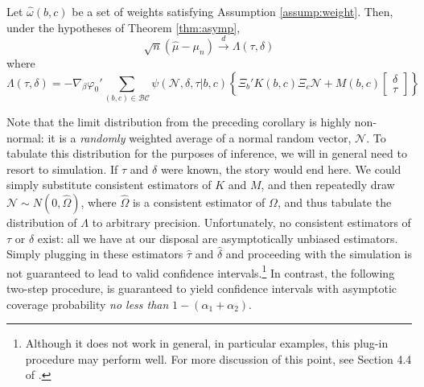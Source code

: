 \begin{cor}
Let $\widehat{\omega}(b,c)$ be a set of weights satisfying Assumption \ref{assump:weight}. Then, under the hypotheses of Theorem \ref{thm:asymp},  
	$$\sqrt{n}\left(\widehat{\mu} - \mu_n\right) \overset{d}{\rightarrow} \Lambda(\tau,\delta)$$
where
	\begin{equation}
		\Lambda(\tau,\delta) = -\nabla_\beta\varphi_0' \sum_{(b,c) \in \mathcal{BC}} \psi(\mathscr{N},\delta, \tau|b,c) \left\{\Xi_b' K(b,c) \Xi_c \mathscr{N} + M(b,c)  \left[\begin{array}{c}\delta \\ \tau \end{array} \right]\right\}
	\end{equation}
\end{cor}
Note that the limit distribution from the preceding corollary is highly non-normal: it is a \emph{randomly} weighted average of a normal random vector, $\mathscr{N}$.
To tabulate this distribution for the purposes of inference, we will in general need to resort to simulation.
If $\tau$ and $\delta$ were known, the story would end here.
We could simply substitute consistent estimators of $K$ and $M$, and then repeatedly draw $\mathscr{N} \sim N(0, \widehat{\Omega})$, where $\widehat{\Omega}$ is a consistent estimator of $\Omega$, and thus tabulate the distribution of $\Lambda$ to arbitrary precision. 
Unfortunately, no consistent estimators of $\tau$ or $\delta$ exist: all we have at our disposal are asymptotically unbiased estimators.
Simply plugging in these estimators $\widehat{\tau}$ and $\widehat{\delta}$ and proceeding with the simulation is not guaranteed to lead to valid confidence intervals.\footnote{Although it does not work in general, in particular examples, this plug-in procedure may perform well. For more discussion of this point, see Section 4.4 of \cite{DiTraglia2012}.}
In contrast, the following two-step procedure, is guaranteed to yield confidence intervals with asymptotic coverage probability \emph{no less than} $1-(\alpha_1 + \alpha_2)$.

